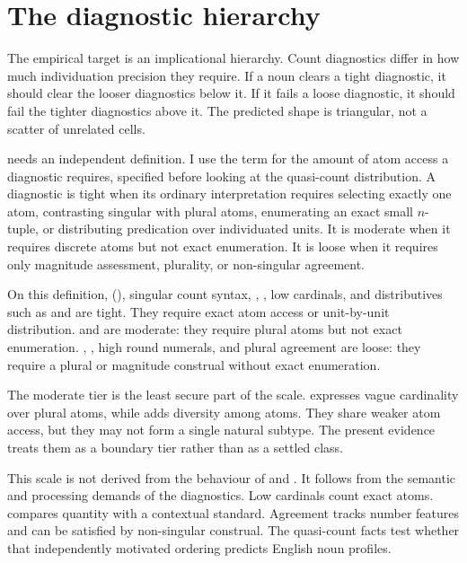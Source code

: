 \documentclass[12pt,a4paper]{article}
\begin{document}
\section{The diagnostic hierarchy}\label{sec:hierarchy-v3}

The empirical target is an implicational hierarchy. Count diagnostics differ in how much individuation precision they require. If a noun clears a tight diagnostic, it should clear the looser diagnostics below it. If it fails a loose diagnostic, it should fail the tighter diagnostics above it. The predicted shape is triangular, not a scatter of unrelated cells.

 needs an independent definition. I use the term for the amount of atom access a diagnostic requires, specified before looking at the quasi-count distribution. A diagnostic is tight when its ordinary interpretation requires selecting exactly one atom, contrasting singular with plural atoms, enumerating an exact small $n$-tuple, or distributing predication over individuated units. It is moderate when it requires discrete atoms but not exact enumeration. It is loose when it requires only magnitude assessment, plurality, or non-singular agreement.

On this definition, (), singular count syntax, , , low cardinals, and distributives such as  and  are tight. They require exact atom access or unit-by-unit distribution.  and  are moderate: they require plural atoms but not exact enumeration. , , high round numerals, and plural agreement are loose: they require a plural or magnitude construal without exact enumeration.

The moderate tier is the least secure part of the scale.  expresses vague cardinality over plural atoms, while  adds diversity among atoms. They share weaker atom access, but they may not form a single natural subtype. The present evidence treats them as a boundary tier rather than as a settled class.

This scale is not derived from the behaviour of  and . It follows from the semantic and processing demands of the diagnostics. Low cardinals count exact atoms.  compares quantity with a contextual standard. Agreement tracks number features and can be satisfied by non-singular construal. The quasi-count facts test whether that independently motivated ordering predicts English noun profiles.
\end{document}
